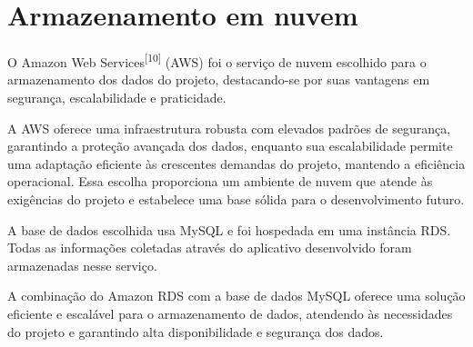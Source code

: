    
    

\section{Armazenamento em nuvem}
O Amazon Web Services\textsuperscript{[10]} (AWS) foi o serviço de nuvem escolhido para o armazenamento dos dados do projeto, destacando-se por suas vantagens em segurança, escalabilidade e praticidade. 

A AWS oferece uma infraestrutura robusta com elevados padrões de segurança, garantindo a proteção avançada dos dados, enquanto sua escalabilidade permite uma adaptação eficiente às crescentes demandas do projeto, mantendo a eficiência operacional. Essa escolha proporciona um ambiente de nuvem que atende às exigências do projeto e estabelece uma base sólida para o desenvolvimento futuro.

A base de dados escolhida usa MySQL e foi hospedada em uma instância RDS. Todas as informações coletadas através do aplicativo desenvolvido foram armazenadas nesse serviço.


A combinação do Amazon RDS com a base de dados MySQL oferece uma solução eficiente e escalável para o armazenamento de dados, atendendo às necessidades do projeto e garantindo alta disponibilidade e segurança dos dados.






